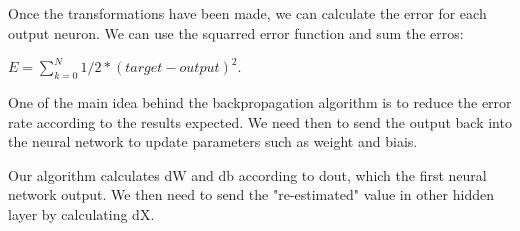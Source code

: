 Once the transformations have been made, we can calculate the error for each output neuron. We can use the squarred error function and sum the erros:

$E = \sum_{k=0}^{N} 1/2*(target - output)^2$.

One of the main idea behind the backpropagation algorithm is to reduce the error rate according to the results expected. We need then to send the output back into the neural network to update parameters such as weight and biais. 

Our algorithm calculates dW and db according to dout, which the first neural network output.
We then need to send the "re-estimated" value in other hidden layer by calculating dX.
